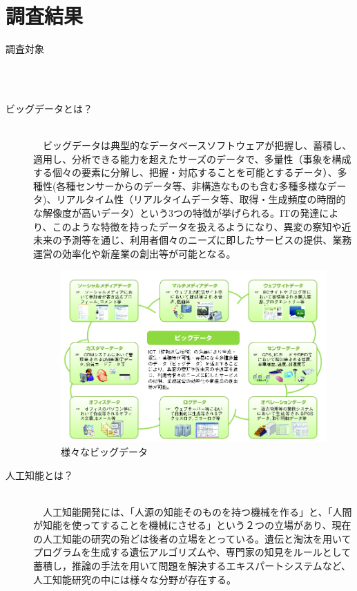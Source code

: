 \documentclass[a4paper,12pt]{jarticle}
\begin{document}
\section{調査結果}
\begin{description}
 \item[調査対象]\mbox\\\\
 \item[ビッグデータとは？]\mbox\\\\
　ビッグデータは典型的なデータベースソフトウェアが把握し、蓄積し、適用し、分析できる能力を超えたサーズのデータで、多量性（事象を構成する個々の要素に分解し、把握・対応することを可能とするデータ）、多種性(各種センサーからのデータ等、非構造なものも含む多種多様なデータ)、リアルタイム性（リアルタイムデータ等、取得・生成頻度の時間的な解像度が高いデータ）という3つの特徴が挙げられる。ITの発達により、このような特徴を持ったデータを扱えるようになり、異変の察知や近未来の予測等を通じ、利用者個々のニーズに即したサービスの提供、業務運営の効率化や新産業の創出等が可能となる。
  \begin{figure}[H]
   \begin{center}
    \includegraphics[width=150truemm]{BigData.png}
    \caption{様々なビッグデータ}
    \label{BigDataPicture}
   \end{center}
  \end{figure}
 \item[人工知能とは？]\mbox\\\\
　人工知能開発には、「人源の知能そのものを持つ機械を作る」と、「人間が知能を使ってすることを機械にさせる」という２つの立場があり、現在の人工知能の研究の殆どは後者の立場をとっている。遺伝と淘汰を用いてプログラムを生成する遺伝アルゴリズムや、専門家の知見をルールとして蓄積し，推論の手法を用いて問題を解決するエキスパートシステムなど、人工知能研究の中には様々な分野が存在する。

\end{description}
\end{document}
